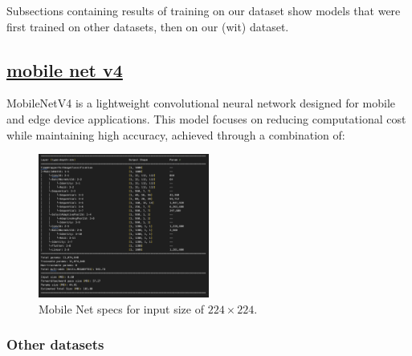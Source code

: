\documentclass[a4paper]{article}
\begin{document}
Subsections containing results of training on our dataset show models that were first trained on other datasets, then on our (wit) dataset.

\subsection{\href{https://huggingface.co/blog/rwightman/mobilenetv4}{mobile net v4}}

MobileNetV4 is a lightweight convolutional neural network designed for mobile and edge device applications. This model focuses on reducing computational cost while maintaining high accuracy, achieved through a combination of:

\begin{figure}[H]
    \centering
    \includegraphics[width=0.5\textwidth]{images/mobile-net.png}
    \caption{Mobile Net specs for input size of $224\times224$.}
\end{figure}

\subsubsection{Other datasets}
\end{document}
